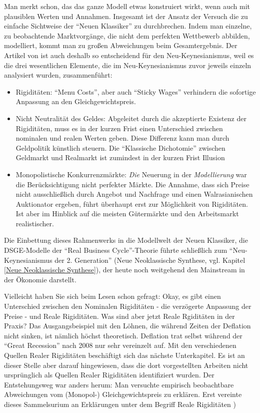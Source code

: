Man merkt schon, das das ganze Modell etwas konstruiert wirkt, wenn auch mit plausiblen Werten und Annahmen. Insgesamt ist der Ansatz der Versuch die zu einfache Sichtweise der "`Neuen Klassiker"' zu durchbrechen. Indem man einzelne, zu beobachtende Marktvorgänge, die nicht dem perfekten Wettbewerb abbilden, modelliert, kommt man zu großen Abweichungen beim Gesamtergebnis. Der Artikel von \textcite{RomerDavid1990} ist auch deshalb so entscheidend für den Neu-Keynesianismus, weil es die drei wesentlichen Elemente, die im Neu-Keynesianismus zuvor jeweils einzeln analysiert wurden, zusammenführt:
\begin{itemize}
	\item Rigiditäten: "`Menu Costs"', aber auch "`Sticky Wages"' verhindern die sofortige Anpassung an den Gleichgewichtspreis.
	\item Nicht Neutralität des Geldes: Abgeleitet durch die akzeptierte Existenz der Rigiditäten, muss es in der kurzen Frist einen Unterschied zwischen nominalen und realen Werten geben. Diese Differenz kann man durch Geldpolitik künstlich steuern. Die "`Klassische Dichotomie"' zwischen Geldmarkt und Realmarkt ist zumindest in der kurzen Frist Illusion
	\item Monopolistische Konkurrenzmärkte: \textit{Die} Neuerung in der \textit{Modellierung} war die Berücksichtigung nicht perfekter Märkte. Die Annahme, dass sich Preise nicht ausschließlich durch Angebot und Nachfrage und einen Walrasianischen Auktionator ergeben, führt überhaupt erst zur Möglichkeit von Rigiditäten. Ist aber im Hinblick auf die meisten Gütermärkte und den Arbeitsmarkt realistischer.
\end{itemize}
Die Einbettung dieses Rahmenwerks in die Modellwelt der Neuen Klassiker, die DSGE-Modelle der "`Real Business Cycle"'-Theorie führte schließlich zum "`Neu-Keynesianismus der 2. Generation"' (Neue Neoklassische Synthese, vgl. Kapitel \ref{Neue Neoklassische Synthese}), der heute noch weitgehend den Mainstream in der Ökonomie darstellt.

Vielleicht haben Sie sich beim Lesen schon gefragt: Okay, es gibt einen Unterschied zwischen den Nominalen Rigiditäten - die verzögerte Anpassung der Preise - und Reale Rigiditäten. Was sind aber jetzt Reale Rgiditäten in der Praxis? Das Ausgangsbeispiel mit den Löhnen, die während Zeiten der Deflation nicht sinken, ist nämlich höchst theoretisch. Deflation trat selbst während der "`Great Recession"' nach 2008 nur sehr vereinzelt auf.
Mit den verschiedenen Quellen Realer Rigiditäten beschäftigt sich das nächste Unterkapitel. Es ist an dieser Stelle aber darauf hingewiesen, dass die dort vorgestellten Arbeiten nicht ursprünglich als Quellen Realer Rigiditäten identifiziert wurden. Der Entstehungsweg war anders herum: Man versuchte empirisch beobachtbare Abweichungen vom (Monopol-) Gleichgewichtspreis zu erklären. Erst \textcite{RomerDavid1990} vereinte dieses Sammelsurium an Erklärungen unter dem Begriff Reale Rigiditäten \textcite[S. 4]{Mankiw1991})




